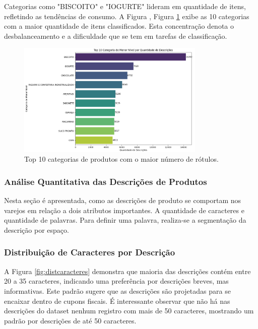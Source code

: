 Categorias como "BISCOITO" e "IOGURTE" lideram em quantidade de itens, refletindo as tendências de consumo. A Figura , Figura \ref{fig:grafico_barras_top10} exibe as 10 categorias com a maior quantidade de itens classificados.  Esta concentração denota o desbalanceamento e a dificuldade que se tem em tarefas de classificação.

 \begin{figure}[H]
    \centering
    \includegraphics[width=0.8\textwidth]{images/grafico_barras_top10.png}
    \caption{Top 10 categorias de produtos com o maior número de rótulos.}
    \label{fig:grafico_barras_top10}
\end{figure}
\subsubsection{Análise Quantitativa das Descrições de Produtos}

Nesta seção é apresentada, como as descrições de produto se comportam nos varejos em relação a dois atributos importantes.  A quantidade de caracteres e quantidade de palavras.  Para definir uma palavra, realiza-se a segmentação da descrição por espaço.

\subsubsection{Distribuição de Caracteres por Descrição}
A Figura \ref{fig:distcaracteres} demonstra que maioria das descrições contém entre 20 a 35 caracteres, indicando uma preferência por descrições breves, mas informativas. Este padrão sugere que as descrições são projetadas para se encaixar dentro de cupons fiscais.  É interessante observar que não há nas descrições do dataset nenhum registro com mais de 50 caracteres, mostrando um padrão por descrições de até 50 caracteres.

